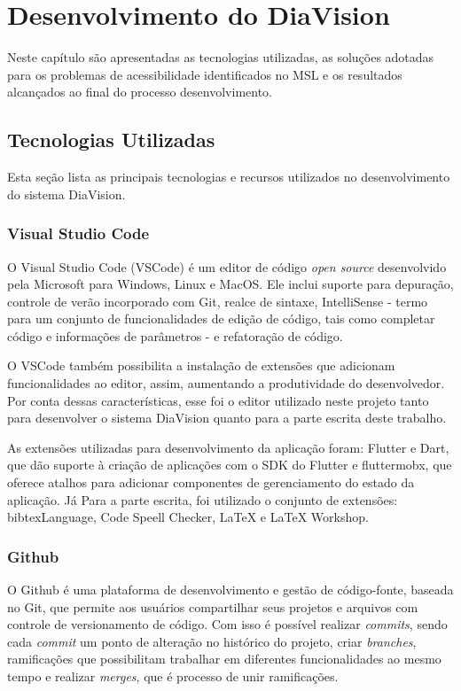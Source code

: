 \chapter{Desenvolvimento do DiaVision}
\label{ch:development}

Neste capítulo são apresentadas as tecnologias utilizadas, as soluções adotadas para os problemas
de acessibilidade identificados no MSL e os resultados alcançados ao final do processo desenvolvimento.

\section{Tecnologias Utilizadas}

Esta seção lista as principais tecnologias e recursos utilizados no desenvolvimento do sistema DiaVision.

\subsection{Visual Studio Code}

O Visual Studio Code (VSCode) é um editor de código \emph{open source} desenvolvido pela Microsoft para Windows, Linux e MacOS.
Ele inclui suporte para depuração, controle de verão incorporado com Git, realce de sintaxe, IntelliSense
- termo para um conjunto de funcionalidades de edição de código, tais como completar código e informações de parâmetros -
e refatoração de código.

O VSCode também possibilita a instalação de extensões que adicionam funcionalidades ao editor, assim, aumentando a produtividade do desenvolvedor.
Por conta dessas características, esse foi o editor utilizado neste projeto tanto para desenvolver o sistema DiaVision quanto para a parte escrita deste trabalho.

As extensões utilizadas para desenvolvimento da aplicação foram: Flutter e Dart, que dão suporte à criação de aplicações com o SDK do Flutter
e fluttermobx, que oferece atalhos para adicionar componentes de gerenciamento do estado da aplicação. Já Para a parte escrita,
foi utilizado o conjunto de extensões: bibtexLanguage, Code Speell Checker, LaTeX e LaTeX Workshop.

\newpage

\subsection{Github}

O Github é uma plataforma de desenvolvimento e gestão de código-fonte, baseada no Git, que permite aos usuários compartilhar seus projetos e arquivos com controle
de versionamento de código. Com isso é possível realizar \emph{commits}, sendo cada \emph{commit} um ponto de alteração no histórico do
projeto, criar \emph{branches}, ramificações que possibilitam trabalhar em diferentes funcionalidades ao mesmo tempo e realizar \emph{merges},
que é processo de unir ramificações.

